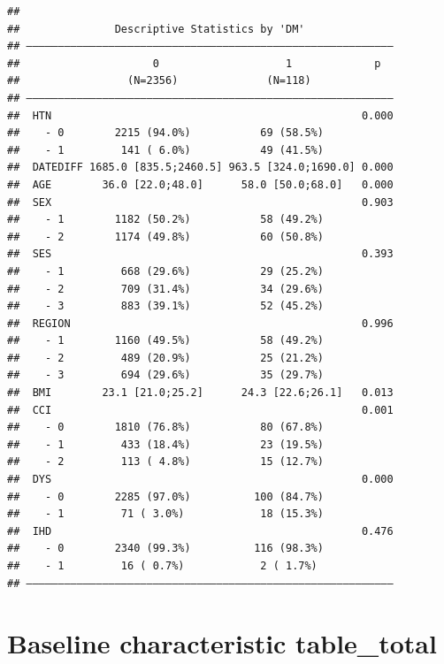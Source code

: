 \documentclass[
]{book}
\theoremstyle{definition}
\theoremstyle{definition}
\theoremstyle{definition}
\theoremstyle{definition}
\theoremstyle{remark}
\begin{document}
\begin{verbatim}
## 
##               Descriptive Statistics by 'DM'             
## —————————————————————————————————————————————————————————— 
##                     0                    1             p  
##                 (N=2356)              (N=118)       
## —————————————————————————————————————————————————————————— 
##  HTN                                                 0.000
##    - 0        2215 (94.0%)           69 (58.5%)           
##    - 1         141 ( 6.0%)           49 (41.5%)           
##  DATEDIFF 1685.0 [835.5;2460.5] 963.5 [324.0;1690.0] 0.000
##  AGE        36.0 [22.0;48.0]      58.0 [50.0;68.0]   0.000
##  SEX                                                 0.903
##    - 1        1182 (50.2%)           58 (49.2%)           
##    - 2        1174 (49.8%)           60 (50.8%)           
##  SES                                                 0.393
##    - 1         668 (29.6%)           29 (25.2%)           
##    - 2         709 (31.4%)           34 (29.6%)           
##    - 3         883 (39.1%)           52 (45.2%)           
##  REGION                                              0.996
##    - 1        1160 (49.5%)           58 (49.2%)           
##    - 2         489 (20.9%)           25 (21.2%)           
##    - 3         694 (29.6%)           35 (29.7%)           
##  BMI        23.1 [21.0;25.2]      24.3 [22.6;26.1]   0.013
##  CCI                                                 0.001
##    - 0        1810 (76.8%)           80 (67.8%)           
##    - 1         433 (18.4%)           23 (19.5%)           
##    - 2         113 ( 4.8%)           15 (12.7%)           
##  DYS                                                 0.000
##    - 0        2285 (97.0%)          100 (84.7%)           
##    - 1         71 ( 3.0%)            18 (15.3%)           
##  IHD                                                 0.476
##    - 0        2340 (99.3%)          116 (98.3%)           
##    - 1         16 ( 0.7%)            2 ( 1.7%)            
## ——————————————————————————————————————————————————————————
\end{verbatim}

\hypertarget{baseline-characteristic-table_total}{%
\section{Baseline characteristic table\_total}\label{baseline-characteristic-table_total}}
\end{document}

